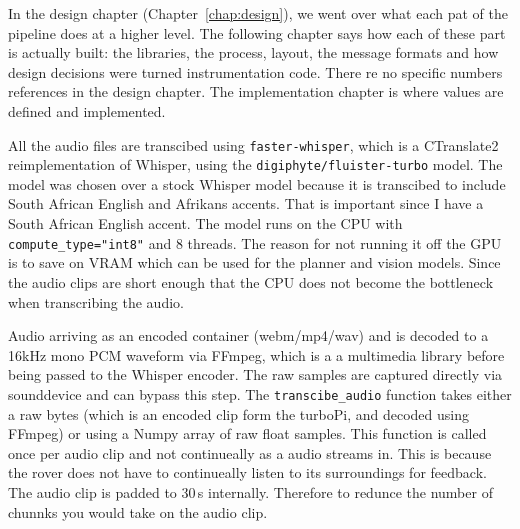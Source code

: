 \label{chap:implementation}



In the design chapter (Chapter~\ref{chap:design}), we went over what each pat of the pipeline does at a higher level. The following chapter
says how each of these part is actually built: the libraries, the process, layout, the message formats and how design decisions were turned instrumentation
code. There re no specific numbers references in the design chapter. The implementation chapter is where values are defined and implemented.

\label{sec:speech}

All the audio files are transcibed using \texttt{faster-whisper}, which is a CTranslate2 reimplementation of Whisper,
using the \texttt{digiphyte/\allowbreak fluister-turbo} model. The model was chosen over a stock Whisper model because it is transcibed
to include South African English and Afrikans accents. That is important since I have a South African English accent. The model runs on the CPU
with \texttt{compute\_type="int8"} and 8 threads. The reason for not running it off the GPU is to save on VRAM which can be used for the planner and
vision models. Since the audio clips are short enough that the CPU does not become the bottleneck when transcribing the audio.

Audio arriving as an encoded container (webm/mp4/wav) and is decoded to a 16kHz mono PCM waveform via FFmpeg, which is a a multimedia library before being passed to the Whisper 
encoder. The raw samples are captured directly via sounddevice and can bypass this step.
The \texttt{transcibe\_audio} function takes either a raw bytes (which is an encoded clip form the turboPi, and decoded using FFmpeg) or using a Numpy array
of raw float samples. This function is called once per audio clip and not continueally as a audio streams in. This is because the rover does not have to continueally
listen to its surroundings for feedback. The audio clip is padded to 30\,s internally. Therefore to redunce the number of chunnks you would take on the audio clip.


